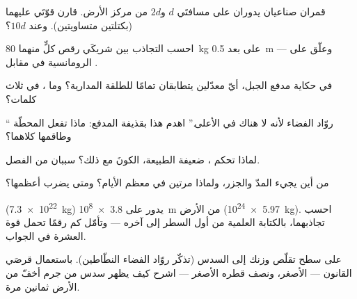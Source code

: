 \begin{exercise}[$\star$]\label{exo:g9:gravitation:3}
قمران صناعيان يدوران على مسافتَي $d$ و$2d$ من مركز الأرض.
قارن قوّتَي  عليهما (بكتلتين متساويتين). وعند $10 d$؟
\end{exercise}

\begin{exercise}[$\star$]\label{exo:g9:gravitation:4}
احسب التجاذب بين شريكَي رقص  كلٍّ منهما \qty{80}{kg} على
بعد \qty{0.5}{m} --- وعلّق على الرومانسية في مقابل .
\end{exercise}

\begin{exercise}[$\star$]\label{exo:g9:gravitation:5}
في حكاية مدفع الجبل، أيّ معدّلين يتطابقان تمامًا للطلقة
المدارية؟ وما ، في ثلاث كلمات؟
\end{exercise}

\begin{exercise}[$\star$]\label{exo:g9:gravitation:6}
`` روّاد الفضاء لأنه لا  هناك في الأعلى.'' اهدم هذا
بقذيفة المدفع: ماذا تفعل المحطّة وطاقمها كلاهما؟
\end{exercise}

\begin{exercise}[$\star$]\label{exo:g9:gravitation:7}
لماذا تحكم ، ضعيفة الطبيعة، الكونَ مع ذلك؟ سببان من
الفصل.
\end{exercise}

\begin{exercise}[$\star$]\label{exo:g9:gravitation:8}
من أين يجيء المدّ والجزر، ولماذا مرتين في معظم الأيام؟ ومتى
يضرب أعظمها؟
\end{exercise}

\begin{exercise}[$\star\star$]\label{exo:g9:gravitation:9}
 (\qty{7.3e22}{kg}) يدور على \qty{3.8e8}{m} من الأرض
(\qty{5.97e24}{kg}). احسب تجاذبهما، بالكتابة العلمية من أول
السطر إلى آخره --- وتأمّل كم رقمًا تحمل قوة العشرة في
الجواب.
\end{exercise}

\begin{exercise}[$\star\star$]\label{exo:g9:gravitation:10}
على سطح  تقلّص وزنك إلى السدس (تذكّر روّاد الفضاء
النطّاطين). باستعمال قرصَي القانون ---   الأصغر،
ونصف قطره الأصغر --- اشرح كيف يظهر سدس من جرم أخفّ من الأرض
ثمانين مرة.
\end{exercise}

